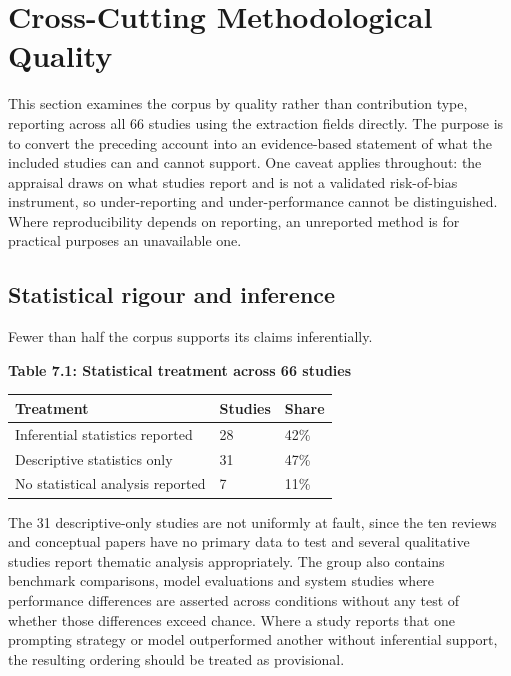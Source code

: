 \documentclass[11pt]{article}
\begin{document}
	\section{Cross-Cutting Methodological Quality}
	
	This section examines the corpus by quality rather than contribution type, reporting across all 66 studies using the extraction fields directly. The purpose is to convert the preceding account into an evidence-based statement of what the included studies can and cannot support. One caveat applies throughout: the appraisal draws on what studies report and is not a validated risk-of-bias instrument, so under-reporting and under-performance cannot be distinguished. Where reproducibility depends on reporting, an unreported method is for practical purposes an unavailable one.
	
	\subsection{Statistical rigour and inference}
	
	Fewer than half the corpus supports its claims inferentially.
	
	\begin{center}
		\textbf{Table 7.1: Statistical treatment across 66 studies}
		\vspace{2pt}
		
		\footnotesize
		\setlength{\tabcolsep}{3pt}\renewcommand{\arraystretch}{1.1}
		\begin{tabularx}{\textwidth}{|X|X|X|}
			\hline
			\textbf{Treatment} & \textbf{Studies} & \textbf{Share} \\
			\hline
			Inferential statistics reported & 28 & 42\% \\
			\hline
			Descriptive statistics only & 31 & 47\% \\
			\hline
			No statistical analysis reported & 7 & 11\% \\
			\hline
		\end{tabularx}
	\end{center}
	
	The 31 descriptive-only studies are not uniformly at fault, since the ten reviews and conceptual papers have no primary data to test and several qualitative studies report thematic analysis appropriately. The group also contains benchmark comparisons, model evaluations and system studies where performance differences are asserted across conditions without any test of whether those differences exceed chance. Where a study reports that one prompting strategy or model outperformed another without inferential support, the resulting ordering should be treated as provisional.
	
\end{document}
